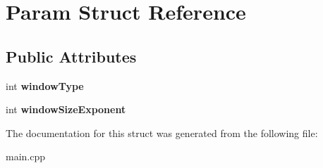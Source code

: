 \hypertarget{structParam}{}\section{Param Struct Reference}
\label{structParam}
\subsection*{Public Attributes}
\begin{DoxyCompactItemize}
\item 
\hypertarget{structParam_ac7c785ec0b717fb0b42ea2880ca28ff9}{}\label{structParam_ac7c785ec0b717fb0b42ea2880ca28ff9} 
int {\bfseries window\+Type}
\item 
\hypertarget{structParam_a35f43462805fe5094dd1662a903107f7}{}\label{structParam_a35f43462805fe5094dd1662a903107f7} 
int {\bfseries window\+Size\+Exponent}
\end{DoxyCompactItemize}


The documentation for this struct was generated from the following file\+:\begin{DoxyCompactItemize}
\item 
main.\+cpp\end{DoxyCompactItemize}
